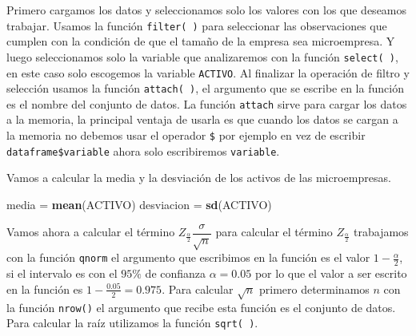 \documentclass[]{book}
\newenvironment{Shaded}{\begin{snugshade}}{\end{snugshade}}
\newcommand{\DataTypeTok}[1]{\textcolor[rgb]{0.13,0.29,0.53}{#1}}
\newcommand{\KeywordTok}[1]{\textcolor[rgb]{0.13,0.29,0.53}{\textbf{#1}}}
\newcommand{\NormalTok}[1]{#1}
\newcommand{\OperatorTok}[1]{\textcolor[rgb]{0.81,0.36,0.00}{\textbf{#1}}}
\newcommand{\OtherTok}[1]{\textcolor[rgb]{0.56,0.35,0.01}{#1}}
\newcommand{\StringTok}[1]{\textcolor[rgb]{0.31,0.60,0.02}{#1}}
\begin{document}
Primero cargamos los datos y seleccionamos solo los valores con los que deseamos trabajar. Usamos la función \texttt{filter(\ )} para seleccionar las observaciones que cumplen con la condición de que el tamaño de la empresa sea microempresa. Y luego seleccionamos solo la variable que analizaremos con la función \texttt{select(\ )}, en este caso solo escogemos la variable \texttt{ACTIVO}. Al finalizar la operación de filtro y selección usamos la función \texttt{attach(\ )}, el argumento que se escribe en la función es el nombre del conjunto de datos. La función \texttt{attach} sirve para cargar los datos a la memoria, la principal ventaja de usarla es que cuando los datos se cargan a la memoria no debemos usar el operador \texttt{\$} por ejemplo en vez de escribir \texttt{dataframe\$variable} ahora solo escribiremos \texttt{variable}.

\begin{Shaded}
\end{Shaded}

Vamos a calcular la media y la desviación de los activos de las microempresas.

\begin{Shaded}
\begin{Highlighting}[]
\NormalTok{media =}\StringTok{ }\KeywordTok{mean}\NormalTok{(ACTIVO)}
\NormalTok{desviacion =}\StringTok{ }\KeywordTok{sd}\NormalTok{(ACTIVO)}
\end{Highlighting}
\end{Shaded}

Vamos ahora a calcular el término \(Z_{\frac{\alpha}{2}}\dfrac{\sigma}{\sqrt{n}}\) para calcular el término \(Z_{\frac{\alpha}{2}}\) trabajamos con la función \texttt{qnorm} el argumento que escribimos en la función es el valor \(1-\frac{\alpha}{2}\), si el intervalo es con el \(95\%\) de confianza \(\alpha=0.05\) por lo que el valor a ser escrito en la función es \(1-\frac{0.05}{2}=0.975\). Para calcular \(\sqrt{n}\) primero determinamos \(n\) con la función \texttt{nrow()} el argumento que recibe esta función es el conjunto de datos. Para calcular la raíz utilizamos la función \texttt{sqrt(\ )}.
\end{document}
